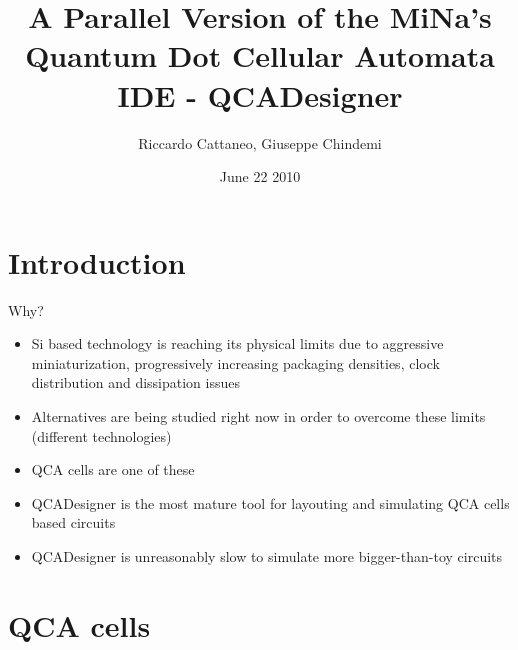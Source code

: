 \documentclass[10pt, red]{beamer}
\title[CUDAQCADesigner]{A Parallel Version of the MiNa's Quantum Dot Cellular Automata IDE - QCADesigner}
\author{Riccardo Cattaneo, Giuseppe Chindemi}
\institute{
  Politecnico di Milano\\
  HPPS
}
\date{June 22 2010}
\begin{document}
\begin{frame}
  \titlepage
\end{frame}

\section{Introduction}
	\begin{frame}{Why?}
		\begin{itemize} 
			\item Si based technology is reaching its physical limits due to aggressive miniaturization, progressively increasing packaging densities, clock distribution and dissipation issues
			\item Alternatives are being studied right now in order to overcome these limits (different technologies)
			\item QCA cells are one of these
			\item QCADesigner is the most mature tool for layouting and simulating QCA cells based circuits
			\item QCADesigner is unreasonably slow to simulate more bigger-than-toy circuits
		\end{itemize}
	\end{frame}


\section{QCA cells}

%	
\end{document}
